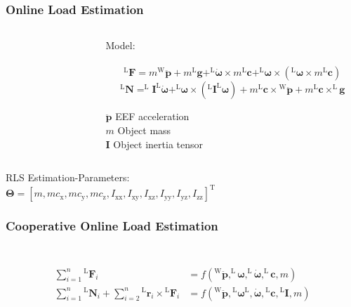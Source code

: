 \documentclass[student,noshadow]{ITRslides}
\renewcommand{\vec}[1]{\boldsymbol{#1}}
\renewcommand{\vec}[1]{\boldsymbol{#1}}
\newcommand{\scr}[1]{\mathrm{#1}}
\begin{document}
\begin{frame}
	\frametitle{Online Load Estimation}

	\begin{columns}
		\centering
		 	\begin{column}{0.25\textwidth}
			\begin{figure}
			\centering
				
			\end{figure}
		 	\end{column}
		 		
		 	\begin{column}{0.75\textwidth}
			Model:\\ \cite{literaturstelle2}\\
			\[^\scr{L}\vec{F} = m {^\scr{W}}\vec{\ddot{p}} + m ^\scr{L}\vec{g} + ^\scr{L}\vec{\dot{\omega}} \times m ^\scr{L}\vec{c} + ^\scr{L}\vec{\omega} \times (^\scr{L}\vec{\omega} \times m ^\scr{L}\vec{c})\]
			\[^\scr{L}\vec{N} = ^\scr{L}\vec{I} ^\scr{L}\vec{\dot{\omega}} + ^\scr{L}\vec{\omega} \times (^\scr{L}\vec{I} ^\scr{L}\vec{\omega}) + m ^\scr{L}\vec{c} \times {^\scr{W}}\vec{\ddot{p}} + m ^\scr{L}\vec{c} \times ^\scr{L}\vec{g}\]
			
			\vspace{0.1cm}
			$\vec{\ddot{p}}$ EEF acceleration\\
			$m$ Object mass\\
			$\vec{I}$  Object inertia tensor
		 	\end{column}
	\end{columns}
	 		\vspace{0.2cm}
			RLS Estimation-Parameters: \\
			$\vec{\Theta} = [m, m c_\scr{x}, m c_\scr{y}, m c_\scr{z}, I_\scr{xx}, I_\scr{xy}, I_\scr{xz}, I_\scr{yy},I_\scr{yz}, I_\scr{zz}]^\scr{T}$ \\
\end{frame}

\begin{frame}
	\frametitle{Cooperative Online Load Estimation}
	\begin{columns}
			\begin{column}{0.5\textwidth}
				\begin{figure}
					\centering
					
				\end{figure}	
		 	\end{column}
		 	\begin{column}{0.5\textwidth}
		 	\end{column}
	\end{columns}

\begin{align*} 
\sum_{i = 1}^{n}  {^\scr{L}}\vec{F}_{i} &=  f\left(^\scr{W}\vec{\ddot{p}},^\scr{L}\vec{\omega},^\scr{L}\vec{\dot{\omega}},^\scr{L}\vec{c},m\right) \\ 
\sum_{i = 1}^n {^\scr{L}}\vec{N}_{i} + \sum_{i = 2}^n {^\scr{L}}\vec{r}_{i} \times {^\scr{L}}\vec{F}_{i} &= f\left({^\scr{W}}\vec{\ddot{p}},{^\scr{L}}\vec{\omega}{^\scr{L}},\vec{\dot{\omega}},{^\scr{L}}\vec{c},{^\scr{L}}\vec{I},m\right)
\end{align*}
\end{frame}
\end{document}
